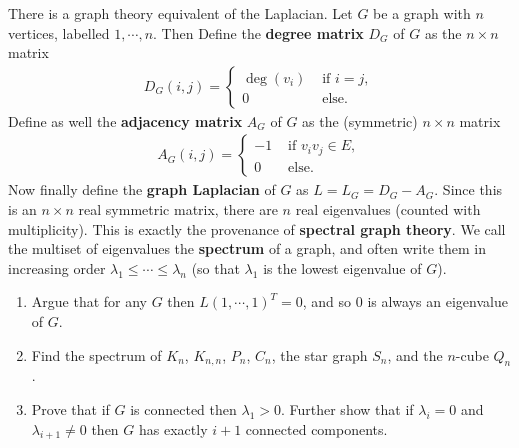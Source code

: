 \begin{enumerate}
    There is a graph theory equivalent of the Laplacian. Let $G$ be a graph with $n$ vertices, labelled $1 , \cdots , n$. Then Define the \textbf{degree matrix} $D_G$ of $G$ as the $n \times n$ matrix
    \begin{align*}
        D_G(i,j) = \begin{cases}
            \deg (v_i) & \text{ if } i=j,\\
            0 & \text{ else}.
        \end{cases}
    \end{align*}
    Define as well the \textbf{adjacency matrix} $A_G$ of $G$ as the (symmetric) $n \times n$ matrix
    \begin{align*}
        A_G(i,j) = \begin{cases}
            -1 & \text{ if } v_i v_j \in E,\\
            0 & \text{ else}.
        \end{cases}
    \end{align*}
    Now finally define the \textbf{graph Laplacian} of $G$ as $L = L_G = D_G - A_G$. Since this is an $n \times n$ real symmetric matrix, there are $n$ real eigenvalues (counted with multiplicity). This is exactly the provenance of \textbf{spectral graph theory}. We call the multiset of eigenvalues the \textbf{spectrum} of a graph, and often write them in increasing order $\lambda_1 \leq \cdots \leq \lambda_n$ (so that $\lambda_1$ is the lowest eigenvalue of $G$).
    \begin{enumerate}
        \item Argue that for any $G$ then $L (1, \cdots, 1)^T = 0$, and so $0$ is always an eigenvalue of $G$.
        \item Find the spectrum of $K_n$, $K_{n,n}$, $P_n$, $C_n$, the star graph $S_n$, and the $n$-cube $Q_n$.
        \item Prove that if $G$ is connected then $\lambda_1> 0$.  Further show that if $\lambda_i = 0$ and $\lambda_{i+1} \neq 0$ then $G$ has exactly $i+1$ connected components.
    \end{enumerate}
\end{enumerate}